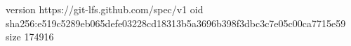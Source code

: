 version https://git-lfs.github.com/spec/v1
oid sha256:e519c5289eb065defe03228cd18313b5a3696b398f3dbc3c7e05c00ca7715e59
size 174916
